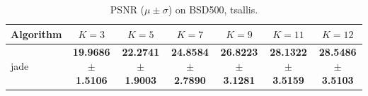 \begin{table}[htbp]
\centering
\caption{PSNR ($\mu \pm \sigma$) on BSD500, tsallis.}
\label{tab:exp1-tsallis-psnr}
\begin{tabular}{lcccccc}
\toprule
Algorithm & $K=3$ & $K=5$ & $K=7$ & $K=9$ & $K=11$ & $K=12$ \\
\midrule
jade & \textbf{19.9686 $\pm$ 1.5106} & \textbf{22.2741 $\pm$ 1.9003} & \textbf{24.8584 $\pm$ 2.7890} & \textbf{26.8223 $\pm$ 3.1281} & \textbf{28.1322 $\pm$ 3.5159} & \textbf{28.5486 $\pm$ 3.5103} \\
\bottomrule
\end{tabular}
\end{table}